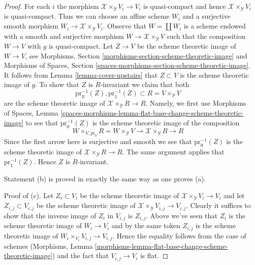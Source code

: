 \documentclass[10pt,a4paper]{amsart}
\theoremstyle{plain}
\theoremstyle{definition}
\theoremstyle{remark}
\numberwithin{equation}{subsection}
\begin{document}
\begin{proof}
\medskip\noindent
For each $i$ the morphism $\mathcal{X} \times_\mathcal{Y} V_i \to V_i$
is quasi-compact and hence $\mathcal{X} \times_\mathcal{Y} V_i$ is
quasi-compact. Thus we can choose an affine scheme $W_i$ and a
surjective smooth morphism $W_i \to \mathcal{X} \times_\mathcal{Y} V_i$.
Observe that $W = \coprod W_i$ is a scheme endowed with
a smooth and surjective morphism $W \to \mathcal{X} \times_\mathcal{Y} V$
such that the composition $W \to V$ with $g$ is quasi-compact.
Let $Z \to V$ be the scheme theoretic image of $W \to V$, see
Morphisms, Section
\ref{morphisms-section-scheme-theoretic-image} and
Morphisms of Spaces, Section
\ref{spaces-morphisms-section-scheme-theoretic-image}.
It follows from Lemma \ref{lemma-cover-upstairs}
that $Z \subset V$ is the scheme theoretic image of $g$.
To show that $Z$ is $R$-invariant we claim that both
$$
\text{pr}_0^{-1}(Z), \text{pr}_1^{-1}(Z) \subset R = V \times_\mathcal{Y} V
$$
are the scheme theoretic image of $\mathcal{X} \times_\mathcal{Y} R \to R$.
Namely, we first use Morphisms of Spaces, Lemma
\ref{spaces-morphisms-lemma-flat-base-change-scheme-theoretic-image}
to see that $\text{pr}_0^{-1}(Z)$ is the scheme theoretic image
of the composition
$$
W \times_{V, \text{pr}_0} R = W \times_\mathcal{Y} V \to
\mathcal{X} \times_\mathcal{Y} R \to R
$$
Since the first arrow here is surjective and smooth we see that
$\text{pr}_0^{-1}(Z)$ is the scheme theoretic image of
$\mathcal{X} \times_\mathcal{Y} R \to R$. The same argument applies
that $\text{pr}_1^{-1}(Z)$. Hence $Z$ is $R$-invariant.

\medskip\noindent
Statement (b) is proved in exactly the same way as one proves (a).

\medskip\noindent
Proof of (c). Let $Z_i \subset V_i$ be the scheme theoretic image
of $\mathcal{X} \times_\mathcal{Y} V_i \to V_i$ and let
$Z_{i, j} \subset V_{i, j}$ be the scheme theoretic image of
$\mathcal{X} \times_\mathcal{Y} V_{i, j} \to V_{i, j}$.
Clearly it suffices to show that the inverse image of $Z_i$
in $V_{i, j}$ is $Z_{i, j}$. Above we've seen that
$Z_i$ is the scheme theoretic image of $W_i \to V_i$
and by the same token $Z_{i, j}$ is the scheme theoretic
image of $W_i \times_{V_i} V_{i, j} \to V_{i, j}$.
Hence the equality follows from the case of schemes
(Morphisms, Lemma
\ref{morphisms-lemma-flat-base-change-scheme-theoretic-image})
and the fact that $V_{i, j} \to V_i$ is flat.
\end{proof}
\end{document}
